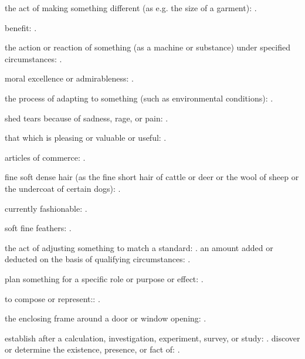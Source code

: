   the act of making something different (as e.g. the size of a garment):   .

  benefit: .

  the action or reaction of something (as a machine or substance) under specified circumstances:   .

  moral excellence or admirableness:   .

  the process of adapting to something (such as environmental conditions):   .

  shed tears because of sadness, rage, or pain:   .

  that which is pleasing or valuable or useful:   .

  articles of commerce:   .

  fine soft dense hair (as the fine short hair of cattle or deer or the wool of sheep or the undercoat of certain dogs):   .

  currently fashionable: .

  soft fine feathers:   .

  the act of adjusting something to match a standard:   . an amount added or deducted on the basis of qualifying circumstances:   .

  plan something for a specific role or purpose or effect: .

  to compose or represent::   .

  the enclosing frame around a door or window opening:   .

  establish after a calculation, investigation, experiment, survey, or study:   . discover or determine the existence, presence, or fact of:   .

